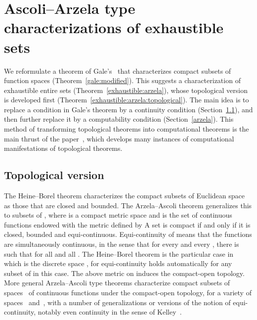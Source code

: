 \documentclass{LMCS}
\begin{document}
\section{Ascoli--Arzela type characterizations of exhaustible sets} \label{arzela:ascoli}


We reformulate a theorem of Gale's~\cite{gale} that characterizes
compact subsets of function spaces (Theorem~\ref{gale:modified}).
This suggests a characterization of exhaustible entire sets
(Theorem~\ref{exhaustible:arzela}), whose topological version is
developed first (Theorem~\ref{exhaustible:arzela:topological}).  The
main idea is to replace a condition in Gale's theorem by a continuity
condition (Section~\ref{arzela:compact}), and then further replace it
by a computability condition (Section~\ref{arzela}). This method of
transforming topological theorems into computational theorems is the
main thrust of the paper~\cite{escardo:barbados}, which develops many
instances of computational manifestations of topological theorems.

\subsection{Topological version}
\label{arzela:compact}



The Heine--Borel theorem characterizes the compact subsets of
Euclidean space~ as those that are closed and bounded. The
Arzela--Ascoli theorem generalizes this to subsets of , where
 is a compact metric space and  is the set of continuous
functions endowed with the metric defined by  A set  is compact if
and only if it is closed, bounded and equi-continuous.
Equi-continuity of  means that the functions  are
simultaneously continuous, in the sense that for every  and
every , there is  such that  for all  and all . The
Heine--Borel theorem is the particular case in which  is the
discrete space , for equi-continuity holds
automatically for any subset of  in this case.  The above metric
on  induces the compact-open topology. More general
Arzela--Ascoli type theorems characterize compact subsets of
spaces~ of continuous functions under the compact-open topology,
for a variety of spaces~ and~, with a number of generalizations
or versions of the notion of equi-continuity, notably even continuity
in the sense of Kelley~\cite{kelley}.
\end{document}

